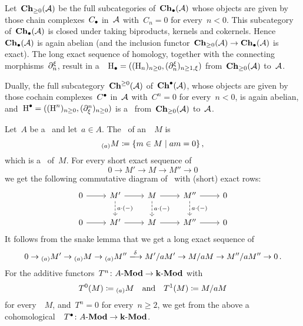 \begin{example}
  Let~$\mathbf{Ch}_{\geq 0}(\mathcal{A})$ be the full subcategories of~$\mathbf{Ch}_\bullet(\mathcal{A})$ whose objects are given by those chain complexes~$C_\bullet$ in~$\mathcal{A}$ with~$C_n = 0$ for every~$n < 0$.
  This subcategory of~$\mathbf{Ch}_\bullet(\mathcal{A})$ is closed under taking biproducts, kernels and cokernels.
  Hence~$\mathbf{Ch}_\bullet(\mathcal{A})$ is again abelian (and the inclusion functor~$\mathbf{Ch}_{\geq 0}(\mathcal{A}) \to \mathbf{Ch}_\bullet(\mathcal{A})$ is exact).
  The long exact sequence of homology, together with the connecting morphisms~$\partial^\xi_n$, result in a~{\deltafun}~$\operatorname{H}_\bullet = ((\operatorname{H}_n)_{n \geq 0}, (\partial^\xi_n)_{n \geq 1, \xi})$ from~$\mathbf{Ch}_{\geq 0}(\mathcal{A})$ to~$\mathcal{A}$.
  
  Dually, the full subcategory~$\mathbf{Ch}^{\geq 0}(\mathcal{A})$ of~$\mathbf{Ch}^\bullet(\mathcal{A})$, whose objects are given by those cochain complexes~$C^\bullet$ in~$\mathcal{A}$ with~$C^n = 0$ for every~$n < 0$, is again abelian, and~$\operatorname{H}^\bullet = ((\operatorname{H}^n)_{n \geq 0}, (\partial_\xi^n)_{n \geq 0})$ is a~{\deltafun} from~$\mathbf{Ch}_{\geq 0}(\mathcal{A})$ to~$\mathcal{A}$.
\end{example}


\begin{example}
  Let~$A$ be a~{\kalg} and let~$a \in A$.
  The~\emph{} of an~{}~$M$ is
  \[
              {}_{(a)} M
    \defined  \{
                m \in M
              \suchthat
                am = 0
              \} \,,
  \]
  which is a~{\submodule{$\kf$}} of~$M$.
  For every short exact sequence of~{}
  \[
    0
    \to
    M'
    \to
    M
    \to
    M''
    \to
    0
  \]
  we get the following commutative diagram of~{\modules{$\kf$}} with (short) exact rows:
  \[
    \begin{tikzcd}
        0
        \arrow{r}
      & M'
        \arrow{r}
        \arrow[dashed]{d}[right]{a \cdot (-)}
      & M
        \arrow{r}
        \arrow[dashed]{d}[right]{a \cdot (-)}
      & M''
        \arrow{r}
        \arrow[dashed]{d}[right]{a \cdot (-)}
      & 0
      \\
        0
        \arrow{r}
      & M'
        \arrow{r}
      & M
        \arrow{r}
      & M''
        \arrow{r}
      & 0
    \end{tikzcd}
  \]
  It follows from the snake lemma that we get a long exact sequence of~{\modules{$\kf$}}
  \[
    0
    \to
    {}_{(a)} M'
    \to
    {}_{(a)} M
    \to
    {}_{(a)} M''
    \xlongto{\delta}
    M'/aM'
    \to
    M/aM
    \to
    M''/aM''
    \to
    0 \,.
  \]
  For the additive functors~$T^n \colon \text{$A$-$\mathbf{Mod}$} \to \text{$\mathbf{k}$-$\mathbf{Mod}$}$ with
  \[
              T^0(M)
    \coloneqq  {}_{(a)} M
    \quad\text{and}\quad
              T^1(M)
    \coloneqq  M/aM
  \]
  for every~{}~$M$, and~$T^n = 0$ for every~$n \geq 2$, we get from the above a cohomological~{\deltafun}~$T^\bullet \colon \text{$A$-$\mathbf{Mod}$} \to \text{$\mathbf{k}$-$\mathbf{Mod}$}$.
\end{example}


